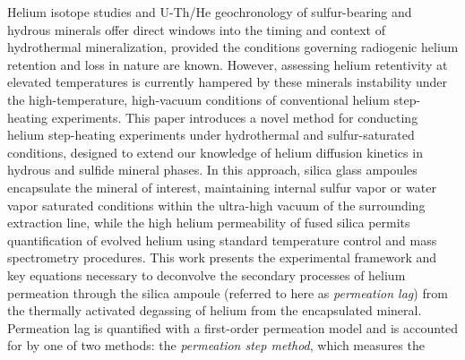 %
%
Helium isotope studies and U-Th/He geochronology of sulfur-bearing and hydrous minerals offer 
direct windows into the timing and context of hydrothermal mineralization, provided the conditions 
governing radiogenic helium retention and loss in nature are known. However, assessing helium 
retentivity at elevated temperatures is currently hampered by these minerals\textquotesingle{} 
instability under the high-temperature, high-vacuum conditions of conventional helium step-heating 
experiments. This paper introduces a novel method for conducting helium step-heating experiments 
under hydrothermal and sulfur-saturated conditions, designed to extend our knowledge of helium 
diffusion kinetics in hydrous and sulfide mineral phases. In this approach, silica glass 
ampoules encapsulate the mineral of interest, maintaining internal sulfur vapor or water 
vapor saturated conditions within the ultra-high vacuum of the surrounding extraction line, 
while the high helium permeability of fused silica permits quantification of evolved helium using 
standard temperature control and mass spectrometry procedures. This work presents the experimental 
framework and key equations necessary to deconvolve the secondary processes of helium permeation through the 
silica ampoule (referred to here as \emph{permeation lag}) from the thermally activated degassing of 
helium from the encapsulated mineral. Permeation lag is quantified with a first-order permeation model 
and is accounted for by one of two methods: the \emph{permeation step method}, which measures the 

